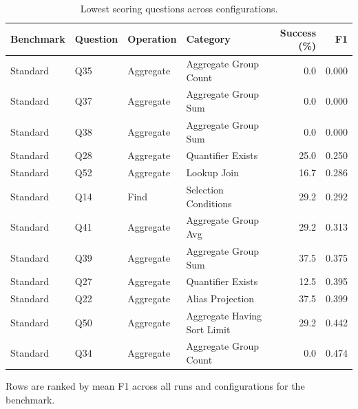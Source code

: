 \begin{table}[htbp]
\centering
\small
\caption{Lowest scoring questions across configurations.}
\label{tab:difficult-questions}
\begin{tabular}{llllrr}
\toprule
Benchmark & Question & Operation & Category & Success (\%) & F1 \\
\midrule
Standard & Q35 & Aggregate & Aggregate Group Count & 0.0 & 0.000 \\
Standard & Q37 & Aggregate & Aggregate Group Sum & 0.0 & 0.000 \\
Standard & Q38 & Aggregate & Aggregate Group Sum & 0.0 & 0.000 \\
Standard & Q28 & Aggregate & Quantifier Exists & 25.0 & 0.250 \\
Standard & Q52 & Aggregate & Lookup Join & 16.7 & 0.286 \\
Standard & Q14 & Find & Selection Conditions & 29.2 & 0.292 \\
Standard & Q41 & Aggregate & Aggregate Group Avg & 29.2 & 0.313 \\
Standard & Q39 & Aggregate & Aggregate Group Sum & 37.5 & 0.375 \\
Standard & Q27 & Aggregate & Quantifier Exists & 12.5 & 0.395 \\
Standard & Q22 & Aggregate & Alias Projection & 37.5 & 0.399 \\
Standard & Q50 & Aggregate & Aggregate Having Sort Limit & 29.2 & 0.442 \\
Standard & Q34 & Aggregate & Aggregate Group Count & 0.0 & 0.474 \\
\bottomrule
\end{tabular}
\par\footnotesize{Rows are ranked by mean F1 across all runs and configurations for the benchmark.}
\end{table}
